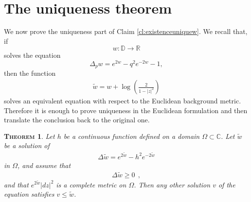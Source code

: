 \documentclass[a4paper,11pt,openright,twoside]{book}
\renewcommand{\Omega}{\varOmega}
\newcommand{\C}{\mathbb{C}}
\newcommand{\1}{\mathds{1}}
\theoremstyle{plain}
\newtheorem{thm}{\textsc{Theorem}}[chapter]
\theoremstyle{definition}
\theoremstyle{remark}
\begin{document}
\section{The uniqueness theorem}

We now prove the uniqueness part of Claim \ref{cl:existenceuniquew}. We recall that, if
\[
w:\mathbb{D}\to\mathbb{R}
\]
solves the equation
\[
\Delta_p w=e^{2w}-q^2e^{-2w}-1,
\]
then the function
\begin{align}\label{eq:unithm6}
	\tilde w=w+\log\left(\frac{2}{1-|z|^2}\right)
\end{align}
solves an equivalent equation with respect to the Euclidean background metric. Therefore it is enough to prove uniqueness in the Euclidean formulation and then translate the conclusion back to the original one.
\begin{thm}\label{th:unithm1}
	Let $h$ be a continuous function defined on a domain $\Omega\subset \C$. Let $\tilde w$ be a solution of
	\begin{align}\label{eq:unithm}
		\Delta\tilde w = e^{2\tilde w} - h^{2} e^{-2\tilde w}
	\end{align}
	in $\Omega$, and assume that
	\begin{align*}
		\Delta\tilde w \geq 0
		\ \ ,
	\end{align*}
	and that $e^{2\tilde w}|dz|^2$ is a complete metric on $\Omega$.
	 Then any other solution $v$ of the equation satisfies $v\leq \tilde w$.
\end{thm}
\end{document}
